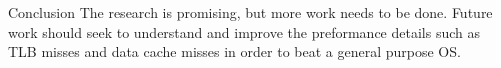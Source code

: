 \begin{block}{Conclusion}
  The research is promising, but more work needs to be done. Future work should seek to understand and improve the preformance details such as TLB misses and data cache misses in order to beat a general purpose OS.
\end{block}
